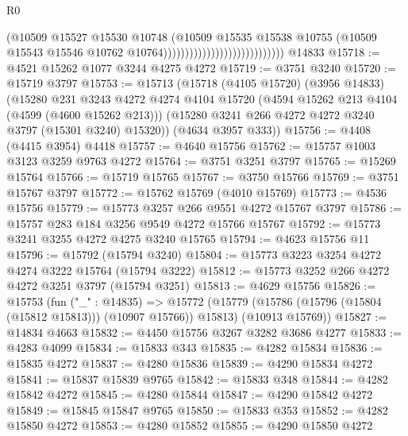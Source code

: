 \begin{lexlean}{R0}
\begin{coremodule}
                                                      (@10509
                                                        @15527
                                                        @15530
                                                        @10748
                                                        (@10509
                                                          @15535
                                                          @15538
                                                          @10755
                                                          (@10509
                                                            @15543
                                                            @15546
                                                            @10762
                                                            @10764))))))))))))))))))))))))))))
    @14833
@15718 := @4521 @15262 @1077 @3244 @4275 @4272
@15719 := @3751 @3240
@15720 := @15719 @3797
@15753 := @15713
    (@15718
      (@4105 @15720)
      (@3956 @14833)
      (@15280
        @231
        @3243
        @4272
        @4274
        @4104
        @15720
        (@4594 @15262 @213 @4104 (@4599 (@4600 @15262 @213)))
        (@15280 @3241 @266 @4272 @4272 @3240 @3797 (@15301 @3240) @15320))
      (@4634 @3957 @333))
@15756 := @4408 (@4415 @3954) @4418
@15757 := @4640 @15756
@15762 := @15757 @1003 @3123 @3259 @9763 @4272
@15764 := @3751 @3251 @3797
@15765 := @15269 @15764
@15766 := @15719 @15765
@15767 := @3750 @15766
@15769 := @3751 @15767 @3797
@15772 := @15762 @15769 (@4010 @15769)
@15773 := @4536 @15756
@15779 := @15773 @3257 @266 @9551 @4272 @15767 @3797
@15786 := @15757 @283 @184 @3256 @9549 @4272 @15766 @15767
@15792 := @15773 @3241 @3255 @4272 @4275 @3240 @15765
@15794 := @4623 @15756 @11
@15796 := @15792 (@15794 @3240)
@15804 := @15773 @3223 @3254 @4272 @4274 @3222 @15764 (@15794 @3222)
@15812 := @15773 @3252 @266 @4272 @4272 @3251 @3797 (@15794 @3251)
@15813 := @4629 @15756
@15826 := @15753
    (fun ("_" : @14835) =>
    @15772
      (@15779 (@15786 (@15796 (@15804 (@15812 @15813))) (@10907 @15766)) @15813)
      (@10913 @15769))
@15827 := @14834 @4663
@15832 := @4450 @15756 @3267 @3282 @3686 @4277
@15833 := @4283 @4099
@15834 := @15833 @343
@15835 := @4282 @15834
@15836 := @15835 @4272
@15837 := @4280 @15836
@15839 := @4290 @15834 @4272
@15841 := @15837 @15839 @9765
@15842 := @15833 @348
@15844 := @4282 @15842 @4272
@15845 := @4280 @15844
@15847 := @4290 @15842 @4272
@15849 := @15845 @15847 @9765
@15850 := @15833 @353
@15852 := @4282 @15850 @4272
@15853 := @4280 @15852
@15855 := @4290 @15850 @4272

\end{coremodule}
\end{lexlean}
